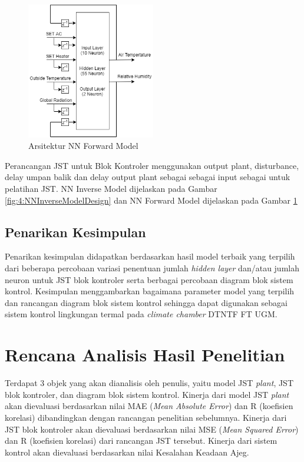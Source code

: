 \begin{figure}[!h]
	\centering
	\includegraphics[width=0.5\textwidth]{figures/NNForwardModelDesign}
	\caption{Arsitektur NN Forward Model}
	\label{fig:4:NNForwardModelDesign}
\end{figure}

Perancangan JST untuk Blok Kontroler menggunakan output plant, disturbance, delay umpan balik dan delay output plant sebagai sebagai input sebagai untuk pelatihan JST. NN Inverse Model dijelaskan pada Gambar \ref{fig:4:NNInverseModelDesign} dan NN Forward Model dijelaskan pada Gambar \ref{fig:4:NNForwardModelDesign}

\subsection{{Penarikan Kesimpulan}}
Penarikan kesimpulan didapatkan berdasarkan hasil model terbaik yang terpilih dari beberapa percobaan variasi penentuan jumlah \textit{hidden layer} dan/atau jumlah neuron untuk JST blok kontroler serta berbagai percobaan diagram blok sistem kontrol. Kesimpulan menggambarkan bagaimana parameter model yang terpilih dan rancangan diagram blok sistem kontrol sehingga dapat digunakan sebagai sistem kontrol lingkungan termal pada \textit{climate chamber} DTNTF FT UGM.

\section{Rencana Analisis Hasil Penelitian}
Terdapat 3 objek yang akan dianalisis oleh penulis, yaitu model JST \textit{plant}, JST blok kontroler, dan diagram blok sistem kontrol. Kinerja dari model JST \textit{plant} akan dievaluasi berdasarkan nilai MAE (\textit{Mean Absolute Error}) dan R (koefisien korelasi) dibandingkan dengan rancangan penelitian sebelumnya. Kinerja dari JST blok kontroler akan dievaluasi berdasarkan nilai MSE (\textit{Mean Squared Error}) dan R (koefisien korelasi) dari rancangan JST tersebut. Kinerja dari sistem kontrol akan dievaluasi berdasarkan nilai Kesalahan Keadaan Ajeg.